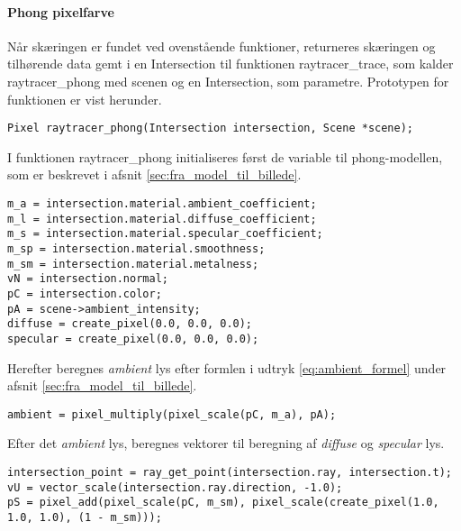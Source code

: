 \paragraph{Phong pixelfarve}
Når skæringen er fundet ved ovenstående funktioner, returneres skæringen og tilhørende data gemt i en Intersection til funktionen raytracer\_trace, som kalder raytracer\_phong med scenen og en Intersection, som parametre. Prototypen for funktionen er vist herunder.

\begin{lstlisting}[style=Cstyle, caption=prototypen til funktionen der beregner pixelfarven på baggrund af data fra skæring med scenen.]
Pixel raytracer_phong(Intersection intersection, Scene *scene);
\end{lstlisting}

I funktionen raytracer\_phong initialiseres først de variable til phong-modellen, som er beskrevet i afsnit
 \ref{sec:fra_model_til_billede}.

\begin{lstlisting}[style=Cstyle, caption=Initialisering af variabler i raytracer\_phong.] 
m_a = intersection.material.ambient_coefficient;
m_l = intersection.material.diffuse_coefficient;
m_s = intersection.material.specular_coefficient;
m_sp = intersection.material.smoothness;
m_sm = intersection.material.metalness;
vN = intersection.normal;
pC = intersection.color;
pA = scene->ambient_intensity;
diffuse = create_pixel(0.0, 0.0, 0.0);
specular = create_pixel(0.0, 0.0, 0.0);
\end{lstlisting}

Herefter beregnes \textit{ambient} lys efter formlen i udtryk \ref{eq:ambient_formel} under afsnit \ref{sec:fra_model_til_billede}.

\begin{lstlisting}[style=Cstyle, caption=Beregning af ambient lys i raytracer\_phong.] 
ambient = pixel_multiply(pixel_scale(pC, m_a), pA);
\end{lstlisting}

Efter det \textit{ambient} lys, beregnes vektorer til beregning af \textit{diffuse} og \textit{specular} lys.

\begin{lstlisting}[style=Cstyle, caption={Beregning af skæring, vektor $\protect\vv{U}$ og pixel S i raytracer\_phong.}] 
intersection_point = ray_get_point(intersection.ray, intersection.t);
vU = vector_scale(intersection.ray.direction, -1.0);
pS = pixel_add(pixel_scale(pC, m_sm), pixel_scale(create_pixel(1.0, 1.0, 1.0), (1 - m_sm)));
\end{lstlisting}

